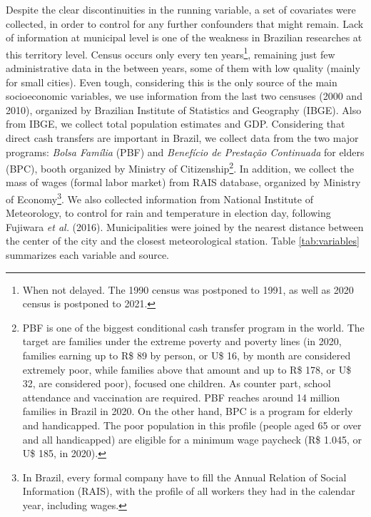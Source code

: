 \documentclass[
  12pt,
]{article}
\begin{document}
Despite the clear discontinuities in the running variable, a set of
covariates were collected, in order to control for any further
confounders that might remain. Lack of information at municipal level is
one of the weakness in Brazilian researches at this territory level.
Census occurs only every ten years\footnote{When not delayed. The 1990
  census was postponed to 1991, as well as 2020 census is postponed to
  2021.}, remaining just few administrative data in the between years,
some of them with low quality (mainly for small cities). Even tough,
considering this is the only source of the main socioeconomic variables,
we use information from the last two censuses (2000 and 2010), organized
by Brazilian Institute of Statistics and Geography (IBGE). Also from
IBGE, we collect total population estimates and GDP. Considering that
direct cash transfers are important in Brazil, we collect data from the
two major programs: \emph{Bolsa Família} (PBF) and \emph{Benefício de
Prestação Continuada} for elders (BPC), booth organized by Ministry of
Citizenship\footnote{PBF is one of the biggest conditional cash transfer
  program in the world. The target are families under the extreme
  poverty and poverty lines (in 2020, families earning up to R\$ 89 by
  person, or U\$ 16, by month are considered extremely poor, while
  families above that amount and up to R\$ 178, or U\$ 32, are
  considered poor), focused one children. As counter part, school
  attendance and vaccination are required. PBF reaches around 14 million
  families in Brazil in 2020. On the other hand, BPC is a program for
  elderly and handicapped. The poor population in this profile (people
  aged 65 or over and all handicapped) are eligible for a minimum wage
  paycheck (R\$ 1.045, or U\$ 185, in 2020).}. In addition, we collect
the mass of wages (formal labor market) from RAIS database, organized by
Ministry of Economy\footnote{In Brazil, every formal company have to
  fill the Annual Relation of Social Information (RAIS), with the
  profile of all workers they had in the calendar year, including wages.}.
We also collected information from National Institute of Meteorology, to
control for rain and temperature in election day, following Fujiwara
\emph{et al.} (2016). Municipalities were joined by the nearest distance
between the center of the city and the closest meteorological station.
Table \ref{tab:variables} summarizes each variable and source.
\end{document}
